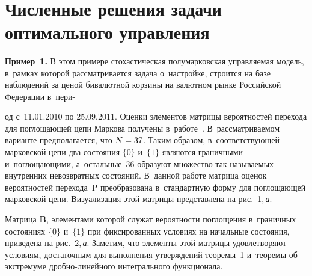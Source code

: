 \begin{multicols}{2}
\begin{figure*} %
\vspace*{1pt}
  \begin{center}
 \mbox{%
 \epsfxsize=159.942mm 
 }
\end{center}
\vspace*{-6pt}
\label{fig}
\vspace*{3pt}
\end{figure*}

\vspace*{-9pt}

\section{Численные решения задачи оптимального управления}

\noindent
\textbf{Пример~1.} В этом примере стохастическая полумарковская управ\-ля\-емая 
модель, в~рамках которой рас\-смат\-ри\-ва\-ет\-ся задача о~настройке, строится на базе 
наблюдений за ценой бивалютной корзины на валютном рынке Российской Федерации 
в~пери-\linebreak\vspace*{-12pt}

\pagebreak

\noindent
од с~11.01.2010 по 25.09.2011. Оценки элементов мат\-ри\-цы вероятностей 
перехода для поглощающей цепи Маркова получены в~работе~\cite{A6}. В~рас\-смат\-ри\-ва\-емом варианте предполагается, что $N \hm= 37$. Таким образом, 
в~со\-от\-вет\-ст\-ву\-ющей марковской цепи два со\-сто\-яния $\{0\}$ и~$\{1\}$ являются граничными 
и~по\-гло\-ща\-ющи\-ми, а~остальные~36 образуют множество так называемых внут\-рен\-них 
невозвратных со\-сто\-яний. В~данной работе мат\-ри\-ца оценок вероятностей перехода~P 
преобразована в~стандартную фор\-му для по\-гло\-ща\-ющей марковской цепи. Визуализация 
этой мат\-ри\-цы пред\-став\-ле\-на на рис.~1,\,\textit{а}.



Матрица $\textbf{B}$, элементами которой служат вероятности поглощения 
в~граничных со\-сто\-яни\-ях $\{0\}$ и~$\{1\}$ при фиксированных условиях на начальные 
со\-сто\-яния, приведена на рис.~2,\,\textit{а}. Заметим, что элементы этой мат\-ри\-цы удовле\-тво\-ря\-ют 
условиям, достаточным для выполнения утверж\-де\-ний тео\-ре\-мы~1 и~тео\-ре\-мы об 
экстремуме дроб\-но-ли\-ней\-но\-го интегрального функционала.




\end{multicols}
